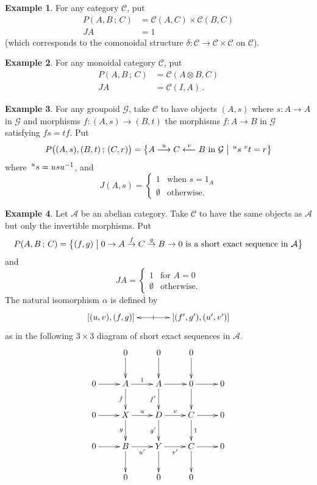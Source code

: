\documentclass[a4paper,12pt]{article}
\theoremstyle{definition}
\newtheorem{example}{Example}[subsection]
\theoremstyle{fact}
\theoremstyle{genquest}
\theoremstyle{step}
\newcommand{\catA}{\mathcal{A}}
\newcommand{\Aut}{\operatorname{Aut}}
\newcommand{\catC}{\mathcal{C}}
\newcommand{\catG}{\mathcal{G}}
\newcommand{\longto}{\longrightarrow}
\newcommand{\longfrom}{\longleftarrow}
\newcommand{\conj}[2]{\mathord{{\let\nolimits\relax\sideset{^{#1}}{}{#2}}}}
\begin{document}
\begin{example}\label{ProEx1}%
For any category $\catC$, put 
\begin{align*}
P (A,B\,;\,C) &= \catC (A,C) \times \catC (B,C)
 \\
JA &= 1
\end{align*}
(which corresponds to the comonoidal structure $\delta : \catC \to \catC \times \catC$ on $\catC$).
\end{example}%


\begin{example}\label{ProEx2}%
For any monoidal category $\catC$, put
\begin{align*}
P (A,B\,;\,C) &= \catC (A \otimes B,C)
\\
JA &= \catC (I,A)\,.
\end{align*}
\end{example}%


\begin{example}\label{ProEx3}%
\fbox{$\catC : =  \Aut \catG$} \quad
For any groupoid $\catG$, take $\catC$ to have objects $(A,s)$ 
where $s : A \to A$ in $\catG$ and morphisms $f : (A,s) \to (B,t)$ the morphisms $ f : A \to B$ in $\catG$ satisfying $f s = t f$.    
Put
\[
P\bigl((A,s),(B,t)\,;\,(C,r)\bigr) = 
 \bigl\{ A \stackrel{u}{\longto} C \stackrel{v}{\longfrom} B \text{ in } \catG \bigm|  \conj{u}{s} \,\conj{v}{t} = r \bigr\}
\]
where $\conj{u}{s} = u s u^{-1}$, and
\[
J (A,s) = \begin{cases}
               1 &\text{when } s = 1_A \\
\emptyset &\text{otherwise}. \end{cases}
\]
\end{example}%


\begin{example}\label{ProEx4}%
Let $\catA$ be an abelian category.   
Take $\catC$ to have the same objects as $\catA$ but only the invertible morphisms. 
Put
\[
P(A,B\,;\,C) = \bigl\{(f,g) \bigm |  0 \to A \stackrel{f}{\to} C \stackrel{g}{\to} B \to 0
\text{ is a short exact sequence in } \catA  \bigr\}
\]
and
\[
JA = \begin{cases}
               1 & \text{for } A = 0 \\
\emptyset &\text{otherwise}.
\end{cases}
\]
The natural isomorphism $\alpha$ is defined by
\[
\xymatrix @C+5mm {
[(u,v),(f,g)] \ar @{<->} [r] |-*@{|} & [(f',g'),(u',v')] }
\]
as in the following $3 \times 3$ diagram of short exact sequences in $\catA$. 
\[
\xymatrix{
& 0 \ar[d] & 0 \ar[d] & 0 \ar[d] & \\
0 \ar[r] & A \ar[d]_-{f} \ar[r]^-{1} & A \ar[d]_-{f'} \ar[r] & 0 \ar[d] \ar[r] & 0 \\
0 \ar[r] & X \ar[d]_-{g} \ar[r]^-{u} & D \ar[d]_-{g'} \ar[r]^-{v} & C \ar[d]^-{1} \ar[r] & 0 \\
0 \ar[r] & B \ar[d] \ar[r]_-{u'} & Y \ar[d] \ar[r]_-{v'} & C \ar[d] \ar[r] & 0 \\
& 0 & 0 & 0 &
}
\]
\end{example}%
\goodbreak
\goodbreak
\end{document}

